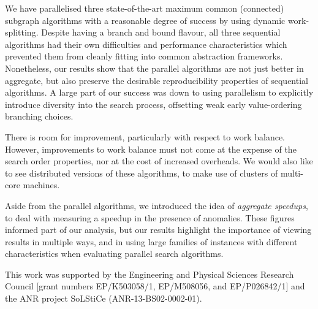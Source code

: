 \documentclass[sigconf]{acmart}
\begin{document}
We have parallelised three state-of-the-art maximum common (connected) subgraph algorithms with a
reasonable degree of success by using dynamic work-splitting. Despite having a branch and bound
flavour, all three sequential algorithms had their own difficulties and performance characteristics
which prevented them from cleanly fitting into common abstraction frameworks. Nonetheless, our
results show that the parallel algorithms are not just better in aggregate, but also preserve the
desirable reproducibility properties of sequential algorithms. A large part of our success was down
to using parallelism to explicitly introduce diversity into the search process, offsetting weak
early value-ordering branching choices.

There is room for improvement, particularly with respect to work balance. However, improvements to
work balance must not come at the expense of the search order properties, nor at the cost of
increased overheads. We would also like to see distributed versions of these algorithms, to make use
of clusters of multi-core machines.

Aside from the parallel algorithms, we introduced the idea of \emph{aggregate speedups}, to deal
with measuring a speedup in the presence of anomalies. These figures informed part of our analysis,
but our results highlight the importance of viewing results in multiple ways, and in using large
families of instances with different characteristics when evaluating parallel search algorithms.

\appendix
\begin{acks}
    This work was supported by the Engineering and Physical Sciences Research Council [grant
numbers EP/K503058/1, EP/M508056, and EP/P026842/1] and the ANR project SoLStiCe
(ANR-13-BS02-0002-01).
\end{acks}



\end{document}
